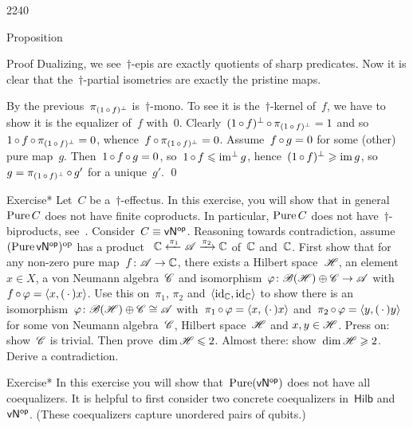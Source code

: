 \begin{parsec}{2240}
\begin{point}{30}{Proposition}
\begin{point}{40}{Proof}
Dualizing, we see~$\dagger$-epis are exactly quotients of sharp predicates.
Now it is clear that the~$\dagger$-partial isometries
are exactly the pristine maps.
\begin{point}{50}%
By the previous~$\pi_{(1 \mathop{\circ} f)^\perp}$ is~$\dagger$-mono.
To see it is the~$\dagger$-kernel of~$f$,
we have to show it is the equalizer of~$f$ with~$0$.
Clearly~$(1 \mathop{\circ} f )^\perp \mathop{\circ} \pi_{(1 \mathop{\circ} f)^\perp} = 1$
and so~$1 \mathop{\circ} f \mathop{\circ} \pi_{(1 \mathop{\circ} f)^\perp} = 0$,
whence~$f \mathop{\circ} \pi_{(1 \mathop{\circ} f)^\perp} = 0$.
Assume~$f \mathop{\circ} g = 0$ for some (other) pure map~$g$.
Then~$1 \mathop{\circ} f \mathop{\circ} g = 0$,
    so~$1 \mathop{\circ} f \leqslant \operatorname{im^\perp} g$,
    hence~$(1 \mathop{\circ} f)^\perp \geqslant \operatorname{im} g$,
    so~$g = \pi_{(1 \mathop{\circ} f)^\perp} \mathop{\circ} g'$
    for a unique~$g'$. \qed
\end{point}
\end{point}
\end{point}
\begin{point}{60}{Exercise*}%
Let~$C$ be a~$\dagger$-effectus.
In this exercise, you will show that
    in general $\operatorname{Pure} C$
    does not have finite coproducts.
In particular, $\operatorname{Pure} C$ does not have~$\dagger$-biproducts,
    see~\cite[3.2.15]{heunenphd}.
Consider~$C \equiv {\mathsf{vN}}{^{\mathsf{op}}}$.
Reasoning towards contradiction,
    assume~$(\operatorname{Pure} {\mathsf{vN}}{^{\mathsf{op}}})^{\mathrm{op}}$
    has a product~$\ \C \xleftarrow{\pi_1} \scrA \xrightarrow{\pi_2} \C$
    of~$\mathbb{C} $ and~$\mathbb{C}$.
First show that for any non-zero pure map~$f\colon \mathscr{A} \to \mathbb{C}$,
    there exists a Hilbert space~$\mathscr{H}$, an element~$x \in X$,
    a von Neumann algebra~$\mathscr{C}$ and
    isomorphism~$\varphi\colon \mathscr{B}(\mathscr{H})\oplus \mathscr{C} \to \mathscr{A}$
    with~$f \mathop{\circ} \varphi = \langle x, (\,\cdot\,) x\rangle $.
Use this on~$\pi_1$, $\pi_2$ and~$\langle\operatorname{id}_{\mathbb{C}},\operatorname{id}_{\mathbb{C}}\rangle $
    to show there is an
    isomorphism~$\varphi\colon  \mathscr{B}(\mathscr{H}) \oplus \mathscr{C} \cong \mathscr{A}$
    with~$\pi_1 \mathop{\circ} \varphi = \left<x,\,(\cdot\,)x\right>$
    and~$\pi_2 \mathop{\circ} \varphi = \left<y,(\,\cdot\,)y\right>$
    for some von Neumann algebra~$\mathscr{C}$,
    Hilbert space~$\mathscr{H}$ and $x,y \in \mathscr{H}$.
Press on: show~$\mathscr{C}$ is trivial.
    Then prove~$\dim \mathscr{H} \leqslant 2$.
    Almost there: show~$\dim \mathscr{H} \geqslant 2$.
    Derive a contradiction.
\end{point}
\begin{point}{70}{Exercise*}%
In this exercise you will show that~$\operatorname{Pure}({\mathsf{vN}}{^{\mathsf{op}}})$ does not have
    all coequalizers.  It is helpful to first consider
    two concrete coequalizers in~$\mathsf{Hilb}$ and~${\mathsf{vN}}{^{\mathsf{op}}}$.
(These coequalizers capture unordered pairs of qubits.)


\end{point}
\end{parsec}
